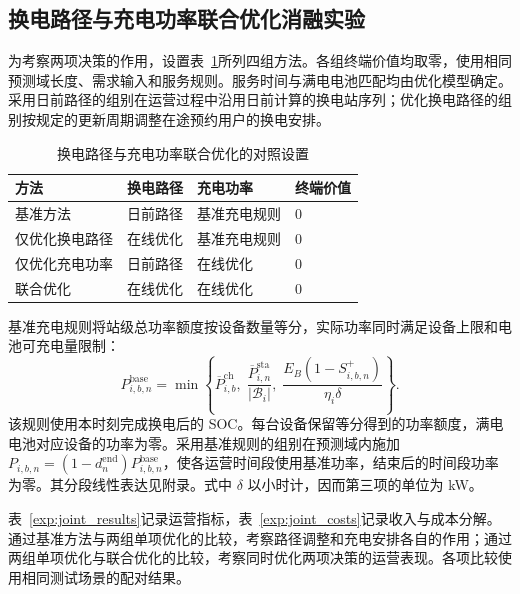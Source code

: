 \documentclass[12pt,a4paper,UTF8]{ctexart}
\numberwithin{equation}{section}
\begin{document}
\FloatBarrier
\subsection{换电路径与充电功率联合优化消融实验}
\label{exp:joint}

为考察两项决策的作用，设置表~\ref{exp:joint_methods}所列四组方法。各组终端价值均取零，使用相同预测域长度、需求输入和服务规则。服务时间与满电电池匹配均由优化模型确定。采用日前路径的组别在运营过程中沿用日前计算的换电站序列；优化换电路径的组别按规定的更新周期调整在途预约用户的换电安排。

\begin{table}[!htbp]
  \centering
  \caption{换电路径与充电功率联合优化的对照设置}
  \label{exp:joint_methods}
  \small
  \begin{tabularx}{\linewidth}{@{}Xlll@{}}
    \toprule
    方法 & 换电路径 & 充电功率 & 终端价值 \\
    \midrule
    基准方法 & 日前路径 & 基准充电规则 & 0 \\
    仅优化换电路径 & 在线优化 & 基准充电规则 & 0 \\
    仅优化充电功率 & 日前路径 & 在线优化 & 0 \\
    联合优化 & 在线优化 & 在线优化 & 0 \\
    \bottomrule
  \end{tabularx}
\end{table}

基准充电规则将站级总功率额度按设备数量等分，实际功率同时满足设备上限和电池可充电量限制：
\begin{equation}
 P_{i,b,n}^{\mathrm{base}}=
 \min\left\{
 \overline P_{i,b}^{\mathrm{ch}},\;
 \frac{\overline P_{i,n}^{\mathrm{sta}}}{|\mathcal B_i|},\;
 \frac{E_B(1-S_{i,b,n}^{+})}{\eta_i\delta}
 \right\}.
 \label{eq:baseline_power}
\end{equation}
该规则使用本时刻完成换电后的 SOC。每台设备保留等分得到的功率额度，满电电池对应设备的功率为零。采用基准规则的组别在预测域内施加 $P_{i,b,n}=(1-d_n^{\mathrm{end}})P_{i,b,n}^{\mathrm{base}}$，使各运营时间段使用基准功率，结束后的时间段功率为零。其分段线性表达见附录。式中 $\delta$ 以小时计，因而第三项的单位为 kW。

表~\ref{exp:joint_results}记录运营指标，表~\ref{exp:joint_costs}记录收入与成本分解。通过基准方法与两组单项优化的比较，考察路径调整和充电安排各自的作用；通过两组单项优化与联合优化的比较，考察同时优化两项决策的运营表现。各项比较使用相同测试场景的配对结果。
\end{document}
